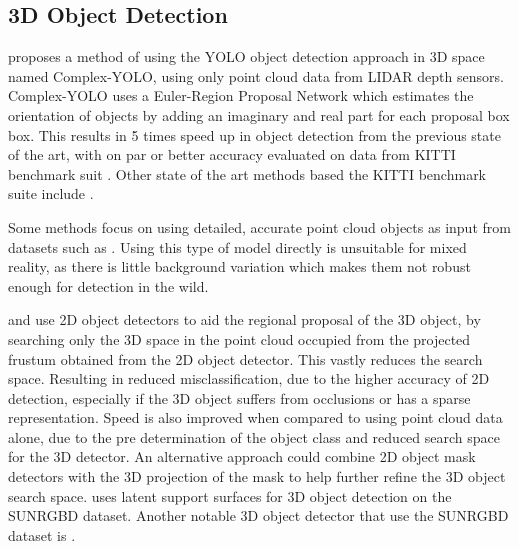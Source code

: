 \documentclass[11pt]{article}
\begin{document}
\subsection*{3D Object Detection}
\cite{complex_YOLO} proposes a method of using the YOLO object detection approach in 3D space named Complex-YOLO, using only point cloud data from LIDAR depth sensors. Complex-YOLO uses a Euler-Region Proposal Network which estimates the orientation of objects by adding an imaginary and real part for each proposal box box. This results in 5 times speed up in object detection from the previous state of the art, with on par or better accuracy evaluated on data from KITTI benchmark suit \cite{KITTI}. Other state of the art methods based the KITTI benchmark suite include \cite{point_fusion}\cite{multi_fusion}\cite{fast_furious}\cite{VoxelNet}. 

Some methods focus on using detailed, accurate point cloud objects as input \cite{subgroup_voting}\cite{pose_RGBD}\cite{real_time_single} from datasets such as \cite{3D_dataset}. Using this type of model directly is unsuitable for mixed reality, as there is little background variation which makes them not robust enough for detection in the wild. 

\cite{PointNets} and \cite{frustum} use 2D object detectors to aid the regional proposal of the 3D object, by searching only the 3D space in the point cloud occupied from the projected frustum obtained from the 2D object detector. This vastly reduces the search space. Resulting in reduced misclassification, due to the higher accuracy of 2D detection, especially if the 3D object suffers from occlusions or has a sparse representation. Speed is also improved when compared to using point cloud data alone, due to the pre determination of the object class and reduced search space for the 3D detector. An alternative approach could combine 2D object mask detectors\cite{first_person_mask}\cite{mask_RCNN} with the 3D projection of the mask to help further refine the 3D object search space. \cite{latent_surface} uses latent support surfaces for 3D object detection on the SUNRGBD dataset. Another notable 3D object detector that use the SUNRGBD dataset is \cite{SnapNet}. 
\end{document}
